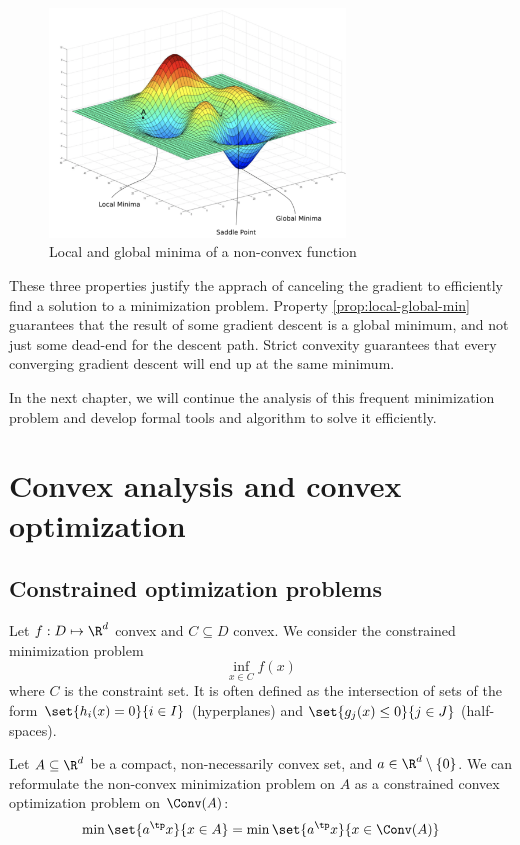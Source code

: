 \documentclass[toc, titlepaged]{../cs-classes/cs-classes}
\begin{document}
\begin{figure}[H]
    \centering
    \captionsetup{justification=centering}
    \includegraphics[width=0.7\textwidth]{images/local-minimum.png}
    \caption{Local and global minima of a non-convex function}
\end{figure}
These three properties justify the apprach of canceling the gradient to efficiently find a solution to a minimization problem. Property \ref{prop:local-global-min} guarantees that the result of some gradient descent is a global minimum, and not just some dead-end for the descent path. Strict convexity guarantees that every converging gradient descent will end up at the same minimum.

In the next chapter, we will continue the analysis of this frequent minimization problem and develop formal tools and algorithm to solve it efficiently.

\section{Convex analysis and convex optimization}
\subsection{Constrained optimization problems}
Let $f:D\mapsto\R^d$ convex and $C\subseteq D$ convex. We consider the constrained minimization problem
\begin{equation*}
    \inf_{x\in C}f(x)
\end{equation*}
where $C$ is the constraint set. It is often  defined as the intersection of sets of the form $\set{h_i(x)=0}{i\in I}$ (hyperplanes) and $\set{g_j(x)\leq0}{j\in J}$ (half-spaces).

\begin{example}
    Let $A\subseteq\R^d$ be a compact, non-necessarily convex set, and $a\in\R^d\setminus\{0\}$. We can reformulate the non-convex minimization problem on $A$ as a constrained convex optimization problem on $\Conv(A)$:
    \begin{equation*}
        \min\set{a^\tp x}{x\in A} = \min\set{a^\tp x}{x\in\Conv(A)}
    \end{equation*}    
\end{example}
\end{document}
